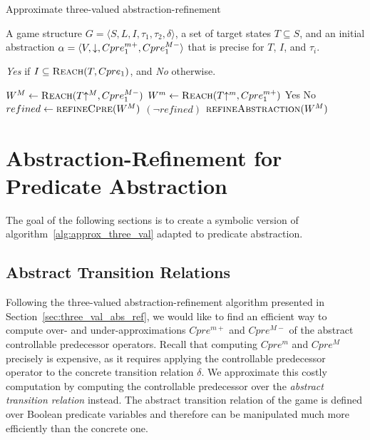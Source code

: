 \begin{algorithm}
\caption{Approximate three-valued abstraction-refinement}
\label{alg:approx_three_val}

\begin{algorithmic}[1]

 A game structure $G = \langle S, L, I, \tau_1, \tau_2, \delta \rangle$, a set of target states $T\subseteq S$, and an initial abstraction $\alpha=\langle V, \mathord{\downarrow}, Cpre_1^{m+}, Cpre_1^{M-} \rangle$ that is precise for $T$, $I$, and $\tau_i$.

 {\it Yes} if $I \subseteq \textsc{Reach}(T, Cpre_1)$, and {\it No} otherwise.

    \Loop
        \State $W^M \gets \textsc{Reach}(T\mathord{\uparrow^M}, Cpre_1^{M-})$
        \State $W^m \gets \textsc{Reach}(T\mathord{\uparrow^m}, Cpre_1^{m+})$
         \Return Yes \label{alg:atv:t1}
         \Return No \label{alg:atv:t2}
        \Else       
            \State $refined \gets \Call{refineCpre}{W^M}$
            \State \algorithmicif{} {$(\neg refined)$}
                $\Call{refineAbstraction}{W^M}$
            \algorithmicend \algorithmicif
        \EndIf
    \EndLoop
\EndFunction

\end{algorithmic}
\end{algorithm}

\section{Abstraction-Refinement for Predicate Abstraction}
\label{sec:abs_ref_pred_abs}

The goal of the following sections is to create a symbolic version of algorithm~\ref{alg:approx_three_val} adapted to predicate abstraction.

\subsection{Abstract Transition Relations}
\label{s:cpre}

Following the three-valued abstraction-refinement algorithm presented in Section~\ref{sec:three_val_abs_ref}, we would like to find an efficient way to compute over- and under-approximations $Cpre^{m+}$ and $Cpre^{M-}$ of the abstract controllable predecessor operators. Recall that computing $Cpre^m$ and $Cpre^M$ precisely is expensive, as it requires applying the controllable predecessor operator to the concrete transition relation $\delta$. We approximate this costly computation by computing the controllable predecessor over the \emph{abstract transition relation} instead. The abstract transition relation of the game is defined over Boolean predicate variables and therefore can be manipulated much more efficiently than the concrete one.


